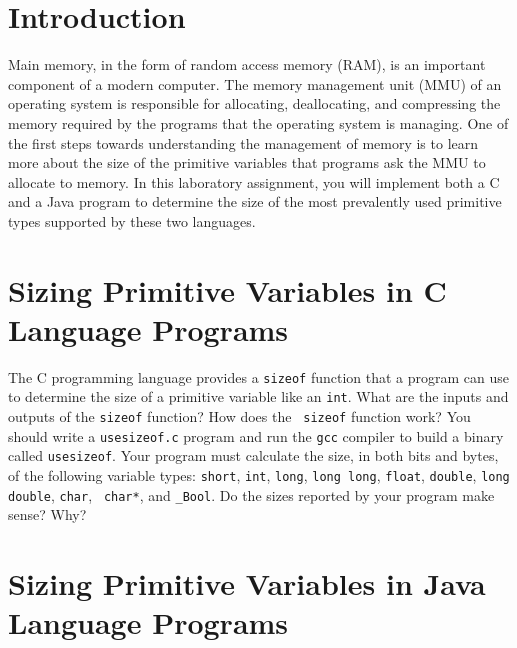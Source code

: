 


\usepackage[compact]{titlesec}



\section*{Introduction}

  Main memory, in the form of random access memory (RAM), is an important component of a modern computer.  The memory
  management unit (MMU) of an operating system is responsible for allocating, deallocating, and compressing the memory
  required by the programs that the operating system is managing. One of the first steps towards understanding the
  management of memory is to learn more about the size of the primitive variables that programs ask the MMU to allocate
  to memory. In this laboratory assignment, you will implement both a C and a Java program to determine the size of the
  most prevalently used primitive types supported by these two languages. 

\section*{Sizing Primitive Variables in C Language Programs}

  The C programming language provides a {\tt sizeof} function that a program can use to determine the size of a
  primitive variable like an {\tt int}. What are the inputs and outputs of the {\tt sizeof} function? How does the {\tt
  sizeof} function work? You should write a {\tt usesizeof.c} program and run the {\tt gcc} compiler to build a binary
  called {\tt usesizeof}. Your program must calculate the size, in both bits and bytes, of the following variable types:
  {\tt short}, {\tt int}, {\tt long}, {\tt long long}, {\tt float}, {\tt double}, {\tt long double}, {\tt char}, {\tt
  char*}, and {\tt \_Bool}. Do the sizes reported by your program make sense? Why?

\section*{Sizing Primitive Variables in Java Language Programs}

